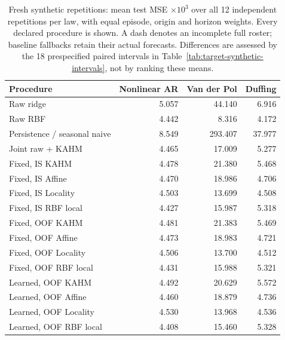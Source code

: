 \begin{table}[!htbp]
\centering\small\setlength{\tabcolsep}{4pt}
\caption{Fresh synthetic repetitions: mean test MSE $\times10^3$ over all 12 independent repetitions per law, with equal episode, origin and horizon weights. Every declared procedure is shown. A dash denotes an incomplete full roster; baseline fallbacks retain their actual forecasts. Differences are assessed by the 18 prespecified paired intervals in Table~\ref{tab:target-synthetic-intervals}, not by ranking these means.}
\label{tab:target-synthetic-main}
\begin{tabular}{lrrr}
\toprule
Procedure & Nonlinear AR & Van der Pol & Duffing \\
\midrule
Raw ridge & 5.057 & 44.140 & 6.916 \\
Raw RBF & 4.442 & 8.316 & 4.172 \\
Persistence / seasonal naive & 8.549 & 293.407 & 37.977 \\
Joint raw + KAHM & 4.465 & 17.009 & 5.277 \\
Fixed, IS KAHM & 4.478 & 21.380 & 5.468 \\
Fixed, IS Affine & 4.470 & 18.986 & 4.706 \\
Fixed, IS Locality & 4.503 & 13.699 & 4.508 \\
Fixed, IS RBF local & 4.427 & 15.987 & 5.318 \\
Fixed, OOF KAHM & 4.481 & 21.383 & 5.469 \\
Fixed, OOF Affine & 4.473 & 18.983 & 4.721 \\
Fixed, OOF Locality & 4.506 & 13.700 & 4.512 \\
Fixed, OOF RBF local & 4.431 & 15.988 & 5.321 \\
Learned, OOF KAHM & 4.492 & 20.629 & 5.572 \\
Learned, OOF Affine & 4.460 & 18.879 & 4.736 \\
Learned, OOF Locality & 4.530 & 13.968 & 4.536 \\
Learned, OOF RBF local & 4.408 & 15.460 & 5.328 \\
\bottomrule
\end{tabular}
\end{table}
